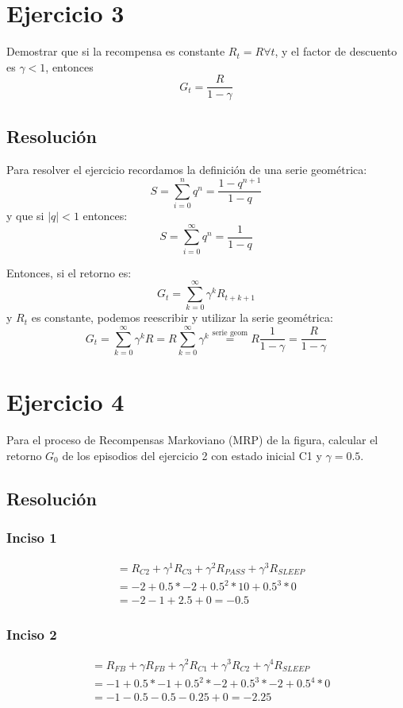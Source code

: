 \documentclass[12pt,a4paper]{article}
\begin{document}
\section{Ejercicio 3}

Demostrar que si la recompensa es constante $R_t = R \forall t$, 
y el factor de descuento es $\gamma<1$, entonces $$G_t = \frac{R}{1-\gamma}$$

\subsection{Resolución}

Para resolver el ejercicio recordamos la definición de una serie geométrica:
$$ S= \sum_{i=0}^n q^n = \frac{1-q^{n+1}}{1-q} $$
y que si $|q|<1$ entonces:
$$ S= \sum_{i=0}^\infty q^n = \frac{1}{1-q} $$

Entonces, si el retorno es:
$$ G_t = \sum_{k=0}^\infty \gamma^k R_{t+k+1} $$
y $R_t$ es constante, podemos reescribir y utilizar la serie geométrica:
$$ G_t = \sum_{k=0}^\infty \gamma^k R = R \sum_{k=0}^\infty \gamma^k \stackrel{\text{serie geom}}{=} R \frac{1}{1-\gamma} = \frac{R}{1-\gamma} $$

\section{Ejercicio 4}

Para el proceso de Recompensas Markoviano (MRP) de la figura,
calcular el retorno $G_0$ de los episodios del ejercicio 2
con estado inicial C1 y $\gamma=0.5$.

\subsection{Resolución}

\subsubsection{Inciso 1}

\begin{align}
\tag{1} &= R_{C2} + \gamma^1 R_{C3} + \gamma^2 R_{PASS}  + \gamma^3 R_{SLEEP} \\
\tag{2} &= -2      + 0.5 * -2      + 0.5^2 * 10         + 0.5^3 * 0 \\
\tag{3} &= -2      -1       + 2.5            + 0 = -0.5
\end{align}

\subsubsection{Inciso 2}
\begin{align}
\tag{1} &= R_{FB} + \gamma R_{FB} + \gamma^2 R_{C1} + \gamma^3 R_{C2} + \gamma^4 R_{SLEEP} \\
\tag{2} &= -1      + 0.5 * -1      + 0.5^2 * -2      + 0.5^3 * -2      + 0.5^4 * 0 \\
\tag{3} &= -1      -0.5            -0.5              -0.25             + 0 = -2.25
\end{align}
\end{document}
